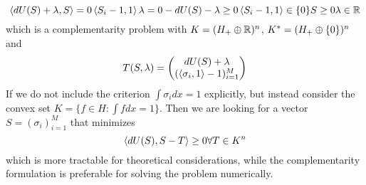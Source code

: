 \begin{equation}
  \label{eq:complementarity_form}
  \left \langle dU(S)+\lambda,S \right \rangle = 0 \\
  \left \langle S_i-1,1 \right \rangle\lambda = 0
  -dU(S)-\lambda \geq 0 \\
  \left \langle S_i-1,1 \right \rangle \in \{0 \}
  S\geq 0
  \lambda \in \mathbb{R}
\end{equation}
which is a complementarity problem with $K = (H_+ \oplus \mathbb{R})^n$, $K^* = (H_+ \oplus \{0\})^n$ and
\begin{equation}
  T(S,\lambda)=\begin{pmatrix} dU(S) + \lambda \\ (\left \langle \sigma_i,1 \right \rangle - 1)_{i=1}^M \end{pmatrix}
\end{equation}
If we do not include the criterion $\int \sigma_i dx = 1$ explicitly, but instead consider the convex set $K=\{f \in H: \int f dx = 1\}$. Then we are looking for a vector $S = (\sigma_i)_{i=1}^M$ that minimizes
\begin{equation}
  \left \langle dU(S),S-T \right \rangle \geq 0 \forall T\in K^n
\end{equation}
which is more tractable for theoretical considerations, while the complementarity formulation is preferable for solving the problem numerically.

